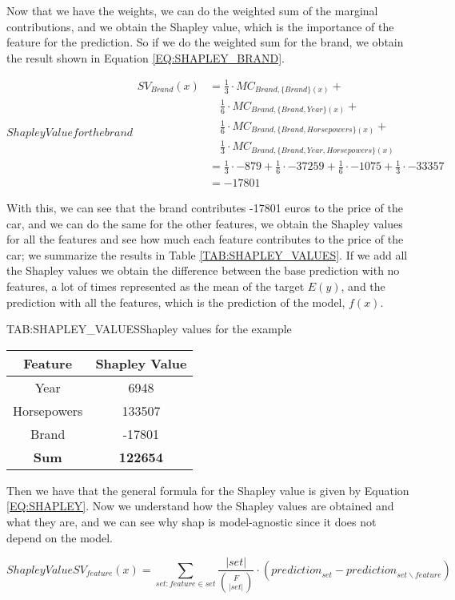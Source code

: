 Now that we have the weights, we can do the weighted sum of the marginal contributions, and we obtain the Shapley value, which is the importance of the feature for the prediction. So if we do the weighted sum for the brand, we obtain the result shown in Equation \ref{EQ:SHAPLEY_BRAND}.

\begin{equation}[EQ:SHAPLEY_BRAND]{Shapley Value for the brand}
    \begin{split}
        SV_{Brand}(x) & = \frac{1}{3} \cdot MC_{Brand, \{Brand\}(x)} + \\ 
        & \quad \frac{1}{6} \cdot MC_{Brand, \{Brand, Year\}(x)} + \\ 
        & \quad \frac{1}{6} \cdot MC_{Brand, \{Brand, Horsepowers\}(x)} + \\ 
        & \quad \frac{1}{3} \cdot MC_{Brand, \{Brand, Year, Horsepowers\}(x)} \\
        & = \frac{1}{3} \cdot -879 + \frac{1}{6} \cdot -37259 + \frac{1}{6} \cdot -1075 + \frac{1}{3} \cdot -33357 \\
        & = -17801
    \end{split}
\end{equation}

With this, we can see that the brand contributes -17801 euros to the price of the car, and we can do the same for the other features, we obtain the Shapley values for all the features and see how much each feature contributes to the price of the car; we summarize the results in Table \ref{TAB:SHAPLEY_VALUES}. If we add all the Shapley values we obtain the difference between the base prediction with no features, a lot of times represented as the mean of the target $E(y)$, and the prediction with all the features, which is the prediction of the model, $f(x)$.
\begin{table}[Shapley Values]{TAB:SHAPLEY_VALUES}{Shapley values for the example}
    \small
    \begin{tabular}{|c|c|}
        \hline
        Feature & Shapley Value \\
        \hline
        Year & 6948 \\
        Horsepowers & 133507 \\
        Brand & -17801 \\
        \hline
        \textbf{Sum} & \textbf{122654} \\
        \hline
    \end{tabular}
\end{table}

Then we have that the general formula for the Shapley value is given by Equation \ref{EQ:SHAPLEY}. Now we understand how the Shapley values are obtained and what they are, and we can see why \ac{shap} is model-agnostic since it does not depend on the model.

\begin{equation}[EQ:SHAPLEY]{Shapley Value}
   \boxed{ SV_{feature}(x) = \sum_{{set:feature} \in {set}} \frac{|{set}| }{{F \choose |{set}|}} \cdot ({prediction}_{set} - {prediction}_{{set} \backslash {feature}})}
\end{equation}
